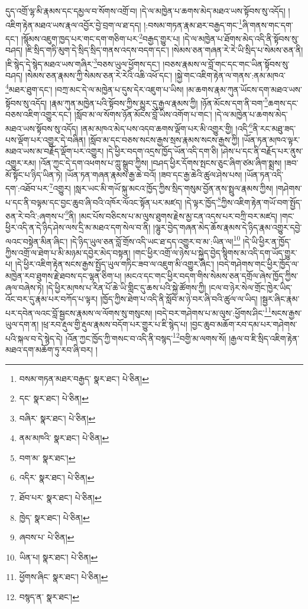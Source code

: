 དུད་འགྲོ་ལྷ་མི་རྣམས་དང་དམྱལ་བ་སོགས་འགྲོ་བ། །དེ་ལ་མཁྱེན་པ་ཆགས་མེད་མཐའ་ཡས་སྟོབས་སུ་འདོད། །འཇིག་རྟེན་མཐའ་ཡས་རྣལ་འབྱོར་བྱེ་བྲག་ལ་ཐ་དད། །:བསམ་གཏན་རྣམ་ཐར་བརྒྱད་གང་\footnote{བསམ་གཏན་མཐར་བརྒྱད་  སྣར་ཐང་།  པེ་ཅིན། }ཞི་གནས་གང་དག་དང་། །སྙོམས་འཇུག་ཁྱད་པར་གང་དག་གཅིག་པར་\footnote{དང་  སྣར་ཐང་།  པེ་ཅིན། }བརྒྱད་གྱུར་པ། །དེ་ལ་མཁྱེན་པ་ཐོགས་མེད་འདི་ནི་སྟོབས་སུ་བཤད། །ཇི་སྲིད་གཏི་མུག་དེ་སྲིད་སྲིད་གནས་འདས་བདག་དང་། །སེམས་ཅན་གཞན་རེ་རེ་ཡི་སྲིད་པ་སེམས་ཅན་ནི། །ཇི་སྙེད་དེ་སྙེད་མཐའ་ཡས་གཞིར་\footnote{བཞིར་  སྣར་ཐང་།  པེ་ཅིན། }བཅས་ཡུལ་ཕྱོགས་དང་། །བཅས་རྣམས་ལ་བློ་གང་དང་གང་ཡིན་སྟོབས་སུ་བཤད། །སེམས་ཅན་རྣམས་ཀྱི་སེམས་ཅན་རེ་རེའི་འཆི་འཕོ་དང་། །སྐྱེ་གང་འཇིག་རྟེན་ལ་གནས་:ནམ་མཁའ་\footnote{ནམ་མཁའི་  སྣར་ཐང་།  པེ་ཅིན། }མཐར་ཐུག་དང་། །བཀྲ་མང་དེ་ལ་མཁྱེན་པ་དུས་དེར་འཇུག་པ་ཡིས། །མ་ཆགས་རྣམ་ཀུན་ཡོངས་དག་མཐའ་ཡས་སྟོབས་སུ་འདོད། །རྣམ་ཀུན་མཁྱེན་པའི་སྟོབས་ཀྱིས་མྱུར་དུ་རྒྱལ་རྣམས་ཀྱི། །ཉོན་མོངས་དག་ནི་བག་\footnote{བག་མ་  སྣར་ཐང་། }ཆགས་དང་བཅས་འཇིག་འགྱུར་དང་། །སློབ་མ་ལ་སོགས་ཉོན་མོངས་བློ་ཡིས་འགོག་པ་གང་། །དེ་ལ་མཁྱེན་པ་ཆགས་མེད་མཐའ་ཡས་སྟོབས་སུ་འདོད། །ནམ་མཁའ་མེད་པས་འདབ་ཆགས་ལྡོག་པར་མི་འགྱུར་གྱི། །འདི་\footnote{འདིར་  སྣར་ཐང་།  པེ་ཅིན། }ནི་རང་མཐུ་ཟད་པས་ལྡོག་པར་འགྱུར་དེ་བཞིན། །སློབ་མ་དང་བཅས་སངས་རྒྱས་སྲས་རྣམས་སངས་རྒྱས་ཀྱི། །ཡོན་ཏན་མཁའ་ལྟར་མཐའ་ཡས་མ་བརྗོད་ལྡོག་པར་འགྱུར། །དེ་ཕྱིར་བདག་འདྲས་ཁྱོད་ཡོན་འདི་དག་ཅི། །ཤེས་པ་དང་ནི་བརྗོད་པར་ནུས་འགྱུར་རམ། །འོན་ཀྱང་དེ་དག་འཕགས་པ་ཀླུ་སྒྲུབ་ཀྱིས། །བཤད་ཕྱིར་དོགས་སྤངས་ཅུང་ཞིག་ཙམ་ཞིག་སྨྲས། །ཟབ་མོ་སྟོང་པ་ཉིད་ཡིན་ཏེ། །ཡོན་ཏན་གཞན་རྣམས་རྒྱ་ཆེ་བའོ། །ཟབ་དང་རྒྱ་ཆེའི་ཚུལ་ཤེས་པས། །ཡོན་ཏན་འདི་དག་:འཐོབ་པར་\footnote{ཐོབ་པར་  སྣར་ཐང་།  པེ་ཅིན། }འགྱུར། །སླར་ཡང་མི་གཡོ་སྐུ་མངའ་ཁྱོད་ཀྱིས་སྲིད་གསུམ་བྱོན་ནས་སྤྲུལ་རྣམས་ཀྱིས། །གཤེགས་པ་དང་ནི་བལྟམ་དང་བྱང་ཆུབ་ཞི་བའི་འཁོར་ལོའང་སྟོན་པར་མཛད། །དེ་ལྟར་ཁྱོད་\footnote{ཁྱེད་  སྣར་ཐང་།  པེ་ཅིན། }ཀྱིས་འཇིག་རྟེན་གཡོ་བག་སྤྱོད་ཅན་རེ་བའི་:ཞགས་པ་\footnote{ཞབས་པ་  པེ་ཅིན། }ནི། །མང་པོས་བཅིངས་པ་མ་ལུས་ཐུགས་རྗེས་མྱ་ངན་འདས་པར་བཀྲི་བར་མཛད། །གང་ཕྱིར་འདི་ན་དེ་ཉིད་ཤེས་ལས་དྲི་མ་མཐའ་དག་སེལ་བ་ནི། །ལྷུར་བྱེད་གཞན་མེད་ཆོས་རྣམས་དེ་ཉིད་རྣམ་འགྱུར་དབྱེ་ལའང་བསྟེན་མིན་ཞིང་། །དེ་ཉིད་ཡུལ་ཅན་བློ་གྲོས་འདི་ཡང་ཐ་དད་འགྱུར་བ་མ་:ཡིན་ལ།\footnote{ཡིན་པ།  སྣར་ཐང་།  པེ་ཅིན། } །དེ་ཡི་ཕྱིར་ན་ཁྱོད་ཀྱིས་འགྲོ་ལ་ཐེག་པ་མི་མཉམ་དབྱེར་མེད་བསྟན། །གང་ཕྱིར་འགྲོ་ལ་ཉེས་པ་སྐྱེད་བྱེད་སྙིགས་མ་འདི་དག་ཡོད་གྱུར་པ། །དེ་ཕྱིར་འཇིག་རྟེན་སངས་རྒྱས་སྤྱོད་ཡུལ་གཏིང་ཟབ་ལ་འཇུག་མི་འགྱུར་ཞིང་། །བདེ་གཤེགས་གང་ཕྱིར་ཁྱོད་ལ་མཁྱེན་རབ་ཐུགས་རྗེ་ཐབས་དང་ལྷན་ཅིག་པ། །མངའ་དང་གང་ཕྱིར་བདག་གིས་སེམས་ཅན་དགྲོལ་ཞེས་ཁྱོད་ཀྱིས་ཞལ་བཞེས་ཏེ། །དེ་ཕྱིར་མཁས་པ་རིན་པོ་ཆེ་ཡི་གླིང་དུ་ཆས་པའི་སྐྱེ་ཚོགས་ཀྱི། །ངལ་བ་ཉེར་སེལ་གྲོང་ཁྱེར་ཡིད་འོང་བར་དུ་རྣམ་པར་བཀོད་པ་ལྟར། །ཁྱོད་ཀྱིས་ཐེག་པ་འདི་ནི་སློབ་མ་ཉེ་བར་ཞི་བའི་ཚུལ་ལ་ཡིད། །སྦྱར་ཞིང་རྣམ་པར་དབེན་ལའང་བློ་སྦྱངས་རྣམས་ལ་ལོགས་སུ་གསུངས། །བདེ་བར་གཤེགས་པ་མ་ལུས་:ཕྱོགས་ཤིང་\footnote{ཕྱོགས་ཞིང་  སྣར་ཐང་།  པེ་ཅིན། }སངས་རྒྱས་ཡུལ་དག་ན། །ཕྲ་རབ་རྡུལ་གྱི་རྡུལ་རྣམས་བདོག་པར་གྱུར་པ་ཇི་སྙེད་པ། །བྱང་ཆུབ་མཆོག་རབ་དམ་པར་གཤེགས་པའི་སྐལ་བ་དེ་སྙེད་དེ། །འོན་ཀྱང་ཁྱོད་ཀྱི་གསང་བ་འདི་ནི་བསྙད་\footnote{བསྙད་ན་  སྣར་ཐང་། }བགྱི་མ་ལགས་སོ། །རྒྱལ་བ་ཇི་སྲིད་འཇིག་རྟེན་མཐའ་དག་མཆོག་ཏུ་རབ་ཞི་བར། །
